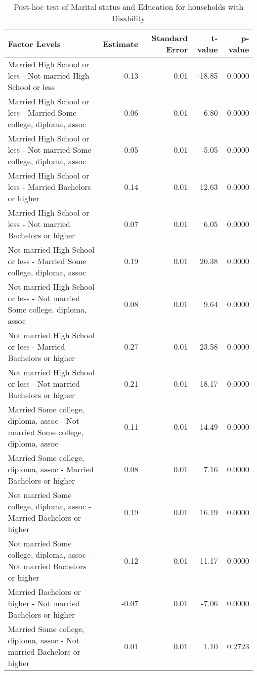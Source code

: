 \begin{table}[H]
\footnotesize
\centering
\begin{tabular}{lrrrr}
  \hline
Factor Levels & Estimate & Standard Error & t-value & p-value \\ 
  \hline
  Married High School or less -  Not married High School or less & -0.13 & 0.01 & -18.85 & 0.0000 \\ 
    Married High School or less -  Married Some college, diploma, assoc & 0.06 & 0.01 & 6.80 & 0.0000 \\ 
    Married High School or less -  Not married Some college, diploma, assoc & -0.05 & 0.01 & -5.05 & 0.0000 \\ 
    Married High School or less -  Married Bachelors or higher & 0.14 & 0.01 & 12.63 & 0.0000 \\ 
    Married High School or less -  Not married Bachelors or higher & 0.07 & 0.01 & 6.05 & 0.0000 \\ 
    Not married High School or less -  Married Some college, diploma, assoc & 0.19 & 0.01 & 20.38 & 0.0000 \\ 
    Not married High School or less -  Not married Some college, diploma, assoc & 0.08 & 0.01 & 9.64 & 0.0000 \\ 
    Not married High School or less -  Married Bachelors or higher & 0.27 & 0.01 & 23.58 & 0.0000 \\ 
    Not married High School or less -  Not married Bachelors or higher & 0.21 & 0.01 & 18.17 & 0.0000 \\ 
    Married Some college, diploma, assoc -  Not married Some college, diploma, assoc & -0.11 & 0.01 & -14.49 & 0.0000 \\ 
    Married Some college, diploma, assoc -  Married Bachelors or higher & 0.08 & 0.01 & 7.16 & 0.0000 \\ 
    Not married Some college, diploma, assoc -  Married Bachelors or higher & 0.19 & 0.01 & 16.19 & 0.0000 \\ 
    Not married Some college, diploma, assoc -  Not married Bachelors or higher & 0.12 & 0.01 & 11.17 & 0.0000 \\ 
    Married Bachelors or higher -  Not married Bachelors or higher & -0.07 & 0.01 & -7.06 & 0.0000 \\ 
    Married Some college, diploma, assoc -  Not married Bachelors or higher & 0.01 & 0.01 & 1.10 & 0.2723 \\ 
   \hline
\end{tabular}
\caption{Post-hoc test of Marital status and Education for households with Disability} 
\label{tab:ms:educationDisb}
\end{table}

